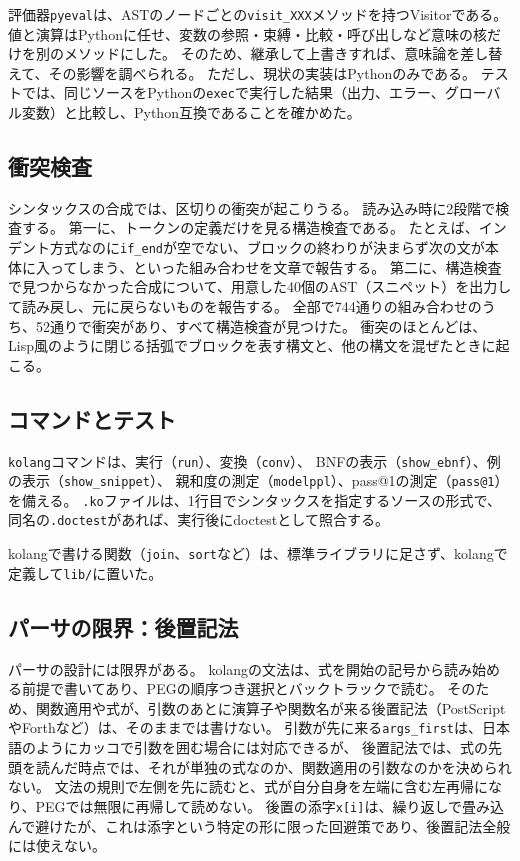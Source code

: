 \documentclass{ipsjprosym}
\begin{document}
評価器\verb|pyeval|は、ASTのノードごとの\verb|visit_XXX|メソッドを持つVisitorである。
値と演算はPythonに任せ、変数の参照・束縛・比較・呼び出しなど意味の核だけを別のメソッドにした。
そのため、継承して上書きすれば、意味論を差し替えて、その影響を調べられる。
ただし、現状の実装はPythonのみである。
テストでは、同じソースをPythonの\verb|exec|で実行した結果（出力、エラー、グローバル変数）と比較し、Python互換であることを確かめた。

\subsection{衝突検査}

シンタックスの合成では、区切りの衝突が起こりうる。
読み込み時に2段階で検査する。
第一に、トークンの定義だけを見る構造検査である。
たとえば、インデント方式なのに\verb|if_end|が空でない、ブロックの終わりが決まらず次の文が本体に入ってしまう、といった組み合わせを文章で報告する。
第二に、構造検査で見つからなかった合成について、用意した40個のAST（スニペット）を出力して読み戻し、元に戻らないものを報告する。
全部で744通りの組み合わせのうち、52通りで衝突があり、すべて構造検査が見つけた。
衝突のほとんどは、Lisp風のように閉じる括弧でブロックを表す構文と、他の構文を混ぜたときに起こる。

\subsection{コマンドとテスト}

\verb|kolang|コマンドは、実行（\verb|run|）、変換（\verb|conv|）、
BNFの表示（\verb|show_ebnf|）、例の表示（\verb|show_snippet|）、
親和度の測定（\verb|modelppl|）、pass@1の測定（\verb|pass@1|）を備える。
\verb|.ko|ファイルは、1行目でシンタックスを指定するソースの形式で、同名の\verb|.doctest|があれば、実行後にdoctestとして照合する。

kolangで書ける関数（\verb|join|、\verb|sort|など）は、標準ライブラリに足さず、kolangで定義して\verb|lib/|に置いた。

\subsection{パーサの限界：後置記法}

パーサの設計には限界がある。
kolangの文法は、式を開始の記号から読み始める前提で書いてあり、PEGの順序つき選択とバックトラックで読む。
そのため、関数適用や式が、引数のあとに演算子や関数名が来る後置記法（PostScriptやForthなど）は、そのままでは書けない。
引数が先に来る\verb|args_first|は、日本語のようにカッコで引数を囲む場合には対応できるが、
後置記法では、式の先頭を読んだ時点では、それが単独の式なのか、関数適用の引数なのかを決められない。
文法の規則で左側を先に読むと、式が自分自身を左端に含む左再帰になり、PEGでは無限に再帰して読めない。
後置の添字\verb|x[i]|は、繰り返しで畳み込んで避けたが、これは添字という特定の形に限った回避策であり、後置記法全般には使えない。
\end{document}
